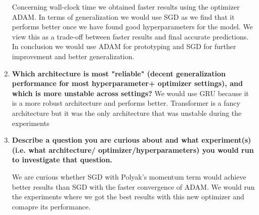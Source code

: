 \begin{enumerate}
Concerning wall-clock time we obtained faster results using the optimizer ADAM. In terms of generalization we would use SGD as we find that it performs better once we have found good hyperparameters for the model. We view this as a trade-off between faster results and final accurate predictions. In conclusion we would use ADAM for prototyping and SGD for further improvement and better generalization.  


\item \textbf{Which architecture is most "reliable" (decent generalization performance for most hyperparameter+
optimizer settings), and which is more unstable across settings?
}
We would use GRU because it is a more robust architecture and performs better. Transformer is a fancy architecture but it was the only architecture that was unstable during the experiments

\item \textbf{Describe a question you are curious about and what experiment(s) (i.e. what architecture/
optimizer/hyperparameters) you would run to investigate that question.}

We are curious whether SGD with Polyak's momentum term would achieve better results than SGD with the faster convergence of ADAM. We would run the experiments where we got the best results with this new optimizer and comapre its performance. 



\end{enumerate}